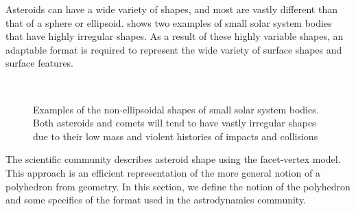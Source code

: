 Asteroids can have a wide variety of shapes, and most are vastly different than that of a sphere or ellipsoid.
 shows two examples of small solar system bodies that have highly irregular shapes.
As a result of these highly variable shapes, an adaptable format is required to represent the wide variety of surface shapes and surface features.
\begin{figure}[h]
    \centering
    ~
    \caption{Examples of the non-ellipsoidal shapes of small solar system bodies. Both asteroids and comets will tend to have vastly irregular shapes due to their low mass and violent histories of impacts and collisions~\label{fig:irregular_asteroids}}
\end{figure}
The scientific community describes asteroid shape using the facet-vertex model.
This approach is an efficient representation of the more general notion of a polyhedron from geometry.
In this section, we define the notion of the polyhedron and some specifics of the format used in the astrodynamics community.

